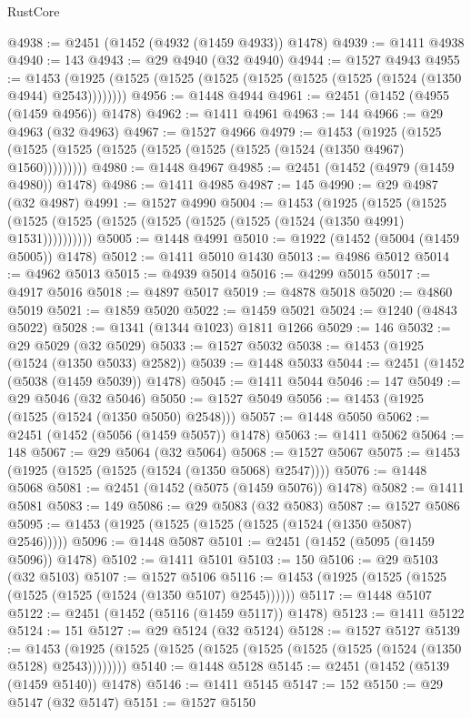 \begin{lexlean}{RustCore}
\begin{coremodule}
@4938 := @2451 (@1452 (@4932 (@1459 @4933)) @1478)
@4939 := @1411 @4938
@4940 := 143
@4943 := @29 @4940 (@32 @4940)
@4944 := @1527 @4943
@4955 := @1453 (@1925 (@1525 (@1525 (@1525 (@1525 (@1525 (@1525 (@1524 (@1350 @4944) @2543))))))))
@4956 := @1448 @4944
@4961 := @2451 (@1452 (@4955 (@1459 @4956)) @1478)
@4962 := @1411 @4961
@4963 := 144
@4966 := @29 @4963 (@32 @4963)
@4967 := @1527 @4966
@4979 := @1453
    (@1925 (@1525 (@1525 (@1525 (@1525 (@1525 (@1525 (@1525 (@1524 (@1350 @4967) @1560)))))))))
@4980 := @1448 @4967
@4985 := @2451 (@1452 (@4979 (@1459 @4980)) @1478)
@4986 := @1411 @4985
@4987 := 145
@4990 := @29 @4987 (@32 @4987)
@4991 := @1527 @4990
@5004 := @1453
    (@1925
      (@1525 (@1525 (@1525 (@1525 (@1525 (@1525 (@1525 (@1525 (@1524 (@1350 @4991) @1531))))))))))
@5005 := @1448 @4991
@5010 := @1922 (@1452 (@5004 (@1459 @5005)) @1478)
@5012 := @1411 @5010 @1430
@5013 := @4986 @5012
@5014 := @4962 @5013
@5015 := @4939 @5014
@5016 := @4299 @5015
@5017 := @4917 @5016
@5018 := @4897 @5017
@5019 := @4878 @5018
@5020 := @4860 @5019
@5021 := @1859 @5020
@5022 := @1459 @5021
@5024 := @1240 (@4843 @5022)
@5028 := @1341 (@1344 @1023) @1811 @1266
@5029 := 146
@5032 := @29 @5029 (@32 @5029)
@5033 := @1527 @5032
@5038 := @1453 (@1925 (@1524 (@1350 @5033) @2582))
@5039 := @1448 @5033
@5044 := @2451 (@1452 (@5038 (@1459 @5039)) @1478)
@5045 := @1411 @5044
@5046 := 147
@5049 := @29 @5046 (@32 @5046)
@5050 := @1527 @5049
@5056 := @1453 (@1925 (@1525 (@1524 (@1350 @5050) @2548)))
@5057 := @1448 @5050
@5062 := @2451 (@1452 (@5056 (@1459 @5057)) @1478)
@5063 := @1411 @5062
@5064 := 148
@5067 := @29 @5064 (@32 @5064)
@5068 := @1527 @5067
@5075 := @1453 (@1925 (@1525 (@1525 (@1524 (@1350 @5068) @2547))))
@5076 := @1448 @5068
@5081 := @2451 (@1452 (@5075 (@1459 @5076)) @1478)
@5082 := @1411 @5081
@5083 := 149
@5086 := @29 @5083 (@32 @5083)
@5087 := @1527 @5086
@5095 := @1453 (@1925 (@1525 (@1525 (@1525 (@1524 (@1350 @5087) @2546)))))
@5096 := @1448 @5087
@5101 := @2451 (@1452 (@5095 (@1459 @5096)) @1478)
@5102 := @1411 @5101
@5103 := 150
@5106 := @29 @5103 (@32 @5103)
@5107 := @1527 @5106
@5116 := @1453 (@1925 (@1525 (@1525 (@1525 (@1525 (@1524 (@1350 @5107) @2545))))))
@5117 := @1448 @5107
@5122 := @2451 (@1452 (@5116 (@1459 @5117)) @1478)
@5123 := @1411 @5122
@5124 := 151
@5127 := @29 @5124 (@32 @5124)
@5128 := @1527 @5127
@5139 := @1453 (@1925 (@1525 (@1525 (@1525 (@1525 (@1525 (@1525 (@1524 (@1350 @5128) @2543))))))))
@5140 := @1448 @5128
@5145 := @2451 (@1452 (@5139 (@1459 @5140)) @1478)
@5146 := @1411 @5145
@5147 := 152
@5150 := @29 @5147 (@32 @5147)
@5151 := @1527 @5150

\end{coremodule}
\end{lexlean}
